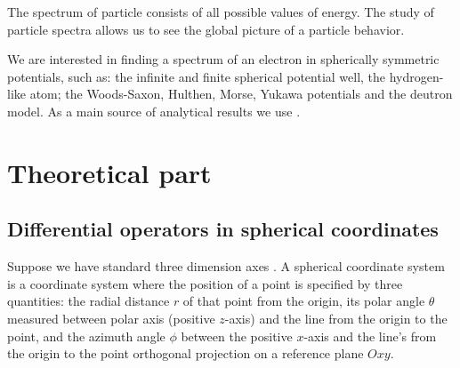 \documentclass[a4paper, 12pt]{article}
\begin{document}
The spectrum of particle consists of all possible values of energy. The study of particle spectra allows us to see the global picture of a particle behavior. 


We are interested in finding a spectrum of an electron in spherically symmetric potentials, such as: the infinite and finite spherical potential well, the hydrogen-like atom; the Woods-Saxon, Hulthen, Morse, Yukawa potentials and the deutron model. As a main source of analytical results we use \cite{flugge2012practical}.

\section{Theoretical part}
\subsection{Differential operators in spherical coordinates}\label{dif_op_3d}


Suppose we have standard three dimension axes . A spherical coordinate system is a coordinate system where the position of a point is specified by three quantities: the radial distance $r$ of that point from the origin, its polar angle $\theta$ measured between polar axis (positive $z$-axis) and the line from the origin to the point, and the azimuth angle $\phi$ between the positive $x$-axis  and the line's from the origin to the point orthogonal projection on a reference plane $Oxy$.
\end{document}
